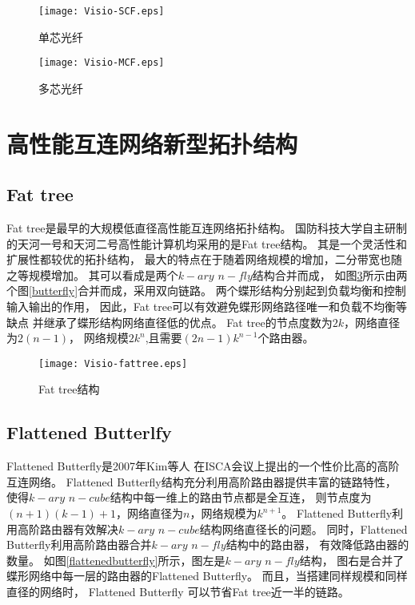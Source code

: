 \begin{figure}[htp]
  \centering
    \texttt{[image: Visio-SCF.eps]}
    \caption{单芯光纤}
    \label{scf}
\end{figure}

\begin{figure}[htp]
  \centering
    \texttt{[image: Visio-MCF.eps]}
      \caption{多芯光纤}
       \label{mcf}
\end{figure}

\section{高性能互连网络新型拓扑结构}

\subsection{Fat tree}
Fat tree是最早的大规模低直径高性能互连网络拓扑结构。
国防科技大学自主研制的天河一号和天河二号高性能计算机均采用的是Fat tree结构。
其是一个灵活性和扩展性都较优的拓扑结构，
最大的特点在于随着网络规模的增加，二分带宽也随之等规模增加。
其可以看成是两个$k-ary$ $n-fly$结构合并而成，
如图\ref{fattree}所示由两个图\ref{butterfly}合并而成，采用双向链路。
两个蝶形结构分别起到负载均衡和控制输入输出的作用，
因此，Fat tree可以有效避免蝶形网络路径唯一和负载不均衡等缺点
并继承了蝶形结构网络直径低的优点。
Fat tree的节点度数为$2k$，网络直径为$2(n-1)$，
网络规模$2k^n$,且需要$(2n-1)k^{n-1}$个路由器。

\begin{figure}[htp]
  \centering
    \texttt{[image: Visio-fattree.eps]}
    \caption{Fat tree结构}
     \label{fattree}
\end{figure}

\subsection{Flattened Butterlfy}

Flattened Butterfly是2007年Kim等人
在ISCA会议上提出的一个性价比高的高阶互连网络。
Flattened Butterfly结构充分利用高阶路由器提供丰富的链路特性，
使得$k-ary$ $n-cube$结构中每一维上的路由节点都是全互连，
则节点度为$(n+1)(k-1)+1$，网络直径为$n$，网络规模为$k^{n+1}$。
Flattened Butterfly利用高阶路由器有效解决$k-ary$ $n-cube$结构网络直径长的问题。
同时，Flattened Butterfly利用高阶路由器合并$k-ary$ $n-fly$结构中的路由器，
有效降低路由器的数量。
如图\ref{flattenedbutterfly}所示，图左是$k-ary$ $n-fly$结构，
图右是合并了蝶形网络中每一层的路由器的Flattened Butterfly。
而且，当搭建同样规模和同样直径的网络时，
Flattened Butterfly 可以节省Fat tree近一半的链路。

